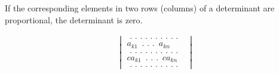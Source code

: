 \documentclass[11pt]{amsbook}
\begin{document}
\begin{thm}
\begin{cor}
	\end{cor}

	\begin{cor}
	
	If the corresponding elements in two rows (columns) of a determinant are proportional, the determinant is zero.
	
	\end{cor}
	
	\begin{align}
		\begin{vmatrix}
			\hspace{4pt}.\hspace{4pt}.\hspace{4pt}.\hspace{4pt}.\hspace{4pt}.\hspace{4pt}.\hspace{4pt}.\hspace{4pt}.\hspace{4pt}.\hspace{4pt}.						\hspace{4pt}\hspace{4pt}\\ 
 			a_{k1}\hspace{6pt} .\hspace{4pt}.\hspace{4pt}.\hspace{6pt} a_{kn} \\ 
			\hspace{4pt}.\hspace{4pt}.\hspace{4pt}.\hspace{4pt}.\hspace{4pt}.\hspace{4pt}.\hspace{4pt}.\hspace{4pt}.\hspace{4pt}.\hspace{4pt}.						\hspace{4pt}\hspace{4pt}\\ 
			ca_{k1}\hspace{6pt} .\hspace{4pt}.\hspace{4pt}.\hspace{6pt} ca_{kn}\\
			\hspace{4pt}.\hspace{4pt}.\hspace{4pt}.\hspace{4pt}.\hspace{4pt}.\hspace{4pt}.\hspace{4pt}.\hspace{4pt}.\hspace{4pt}.\hspace{4pt}.						\hspace{4pt}\hspace{4pt}

\end{vmatrix}
\end{align}
\end{thm}
\end{document}
